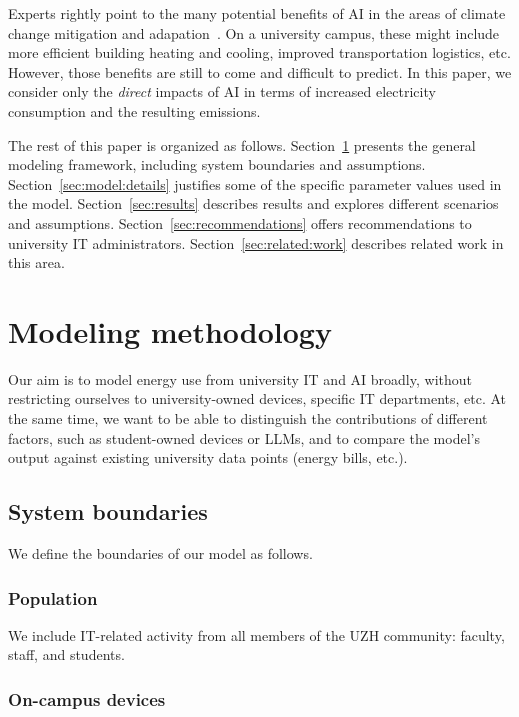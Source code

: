 \documentclass[11pt]{article}
\begin{document}
Experts rightly point to the many potential benefits of AI in the areas of climate change mitigation and adapation~\cite{climate:change:ai}. On a university campus, these might include more efficient building heating and cooling, improved transportation logistics, etc. However, those benefits are still to come and difficult to predict. In this paper, we consider only the {\em direct} impacts of AI in terms of increased electricity consumption and the resulting emissions.

The rest of this paper is organized as follows. Section~\ref{sec:model:methodology} presents the general modeling framework, including system boundaries and assumptions. Section~\ref{sec:model:details} justifies some of the specific parameter values used in the model. Section~\ref{sec:results} describes results and explores different scenarios and assumptions. Section~\ref{sec:recommendations} offers recommendations to university IT administrators. Section~\ref{sec:related:work} describes related work in this area.

\section{Modeling methodology}
\label{sec:model:methodology}

Our aim is to model energy use from university IT and AI broadly, without restricting ourselves to university-owned devices, specific IT departments, etc. At the same time, we want to be able to distinguish the contributions of different factors, such as student-owned devices or LLMs, and to compare the model's output against existing university data points (energy bills, etc.).

\subsection{System boundaries}

We define the boundaries of our model as follows.

\subsubsection*{Population}

We include IT-related activity from all members of the UZH community: faculty, staff, and students.

\subsubsection*{On-campus devices}
\end{document}
